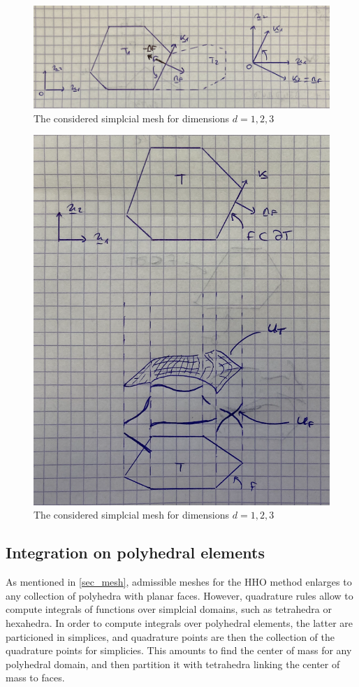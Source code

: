         \begin{figure}[h!]
            \centering
            \includegraphics[width=10.cm]{img/geometry_0.png}
            \caption{The considered simplcial mesh for dimensions $d = 1, 2, 3$}
            \label{fig_geometry_0}
        \end{figure}
        \begin{figure}[h!]
            \centering
            \includegraphics[width=10.cm]{img/geometry_1.png}
            \caption{The considered simplcial mesh for dimensions $d = 1, 2, 3$}
            \label{fig_geometry_1}
        \end{figure}

    \subsection{Integration on polyhedral elements}

        As mentioned in \ref{sec_mesh}, admissible meshes for the HHO method enlarges to any collection of polyhedra with planar faces. However, quadrature rules allow to compute integrals of functions over simplcial domains, such as tetrahedra or hexahedra. In order to compute integrals over polyhedral elements, the latter are particioned in simplices, and quadrature points are then the collection of the quadrature points for simplicies. This amounts to find the center of mass for any polyhedral domain, and then partition it with tetrahedra linking the center of mass to faces.

